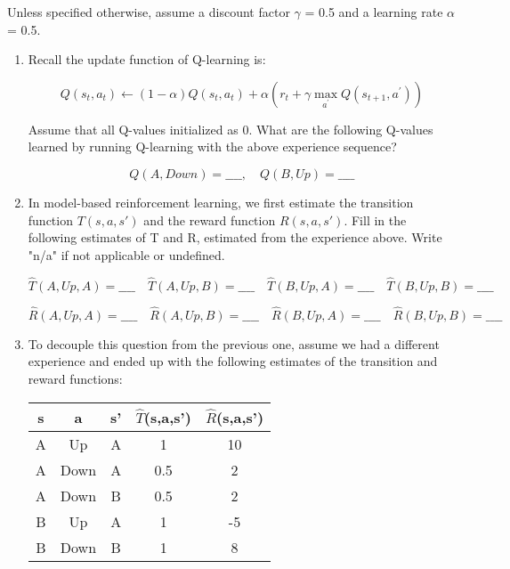 \documentclass[11pt, answers]{exam}
\begin{document}
Unless specified otherwise, assume a discount factor $\gamma$ = 0.5 and a learning rate $\alpha$ = 0.5.\\
\begin{enumerate}

\item Recall the update function of Q-learning is:

$$Q\left(s_{t}, a_{t}\right) \leftarrow(1-\alpha) Q\left(s_{t}, a_{t}\right)+\alpha\left(r_{t}+\gamma \max _{a^{\prime}} Q\left(s_{t+1}, a^{\prime}\right)\right)$$

Assume that all Q-values initialized as 0. What are the following Q-values learned by running Q-learning with the above experience sequence?

$$Q(A,Down)=\_\_\_\_, \quad Q(B,Up)=\_\_\_\_$$

\item In model-based reinforcement learning, we first estimate the transition function $T(s,a,s')$ and the reward function $R(s,a,s')$. Fill in the following estimates of T and R, estimated from the experience above. Write "n/a" if not applicable or undefined.

$$\hat{T}(A,Up,A)=\_\_\_\_ \quad \hat{T}(A,Up,B)=\_\_\_\_ \quad \hat{T}(B,Up,A)=\_\_\_\_ \quad \hat{T}(B,Up,B)=\_\_\_\_$$

$$\hat{R}(A,Up,A)=\_\_\_\_ \quad \hat{R}(A,Up,B)=\_\_\_\_ \quad \hat{R}(B,Up,A)=\_\_\_\_ \quad \hat{R}(B,Up,B)=\_\_\_\_$$

\newpage

\item To decouple this question from the previous one, assume we had a different experience and ended up with the following estimates of the transition and reward functions:


\begin{table}[h!]
\centering
\begin{tabular}{|c|c|c|c|c|}
\hline
s & a    & s' & $\hat{T}$(s,a,s') & $\hat{R}$(s,a,s') \\ \hline
A & Up   & A  & 1         & 10        \\ \hline
A & Down & A  & 0.5       & 2         \\ \hline
A & Down & B  & 0.5       & 2         \\ \hline
B & Up   & A  & 1         & -5        \\ \hline
B & Down & B  & 1         & 8         \\ \hline
\end{tabular}
\end{table}


\end{enumerate}
\end{document}
